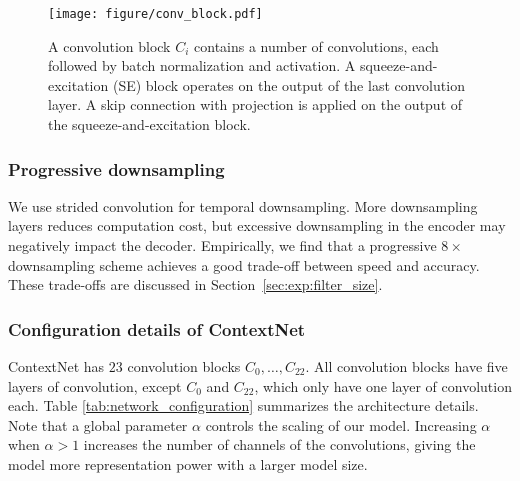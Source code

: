 \documentclass[a4paper]{article}
\newcommand{\netname}{ContextNet}
\begin{document}
\begin{figure}
    \centering
    \texttt{[image: figure/conv\_block.pdf]}
    \caption{A convolution block $C_i$ contains a number of convolutions, each followed by batch normalization and activation. A squeeze-and-excitation (SE) block operates on the output of the last convolution layer. A skip connection with projection is applied on the output of the squeeze-and-excitation block. }
    \label{fig:conv_block}
\end{figure}

\vspace{-0.05in}
\subsubsection{Progressive downsampling}
We use strided convolution for temporal downsampling. More downsampling layers reduces computation cost, but excessive downsampling in the encoder may negatively impact the decoder. Empirically, we find that a progressive $8\times$ downsampling scheme achieves a good trade-off between speed and accuracy. These trade-offs are discussed in Section~\ref{sec:exp:filter_size}.

\vspace{-0.05in}
\subsubsection{Configuration details of \netname}
\vspace{-0.02in}
\label{sec:model:details}
\netname{} has $23$ convolution blocks $C_0, \ldots, C_{22}$. All convolution blocks have five layers of convolution, except $C_0$ and $C_{22}$, which only have one layer of convolution each. Table \ref{tab:network_configuration} summarizes the architecture details.
Note that a global parameter $\alpha$ controls the scaling of our model. Increasing $\alpha$ when $\alpha > 1$ increases the number of channels of the convolutions, giving the model more representation power with a larger model size.
\end{document}
